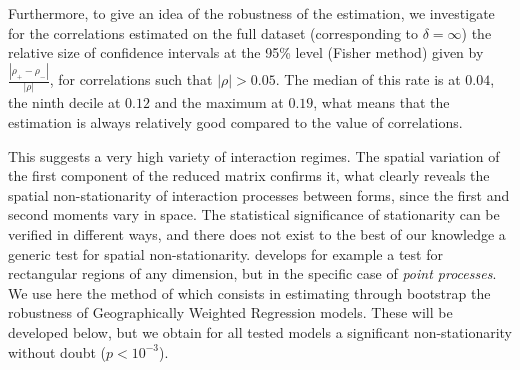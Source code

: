Furthermore, to give an idea of the robustness of the estimation, we investigate for the correlations estimated on the full dataset (corresponding to $\delta = \infty$) the relative size of confidence intervals at the 95\% level (Fisher method) given by $\frac{\left|\rho_+ - \rho_-\right|}{\left|\rho\right|}$, for correlations such that $\left|\rho\right|>0.05$. The median of this rate is at $0.04$, the ninth decile at $0.12$ and the maximum at $0.19$, what means that the estimation is always relatively good compared to the value of correlations.



This suggests a very high variety of interaction regimes. The spatial variation of the first component of the reduced matrix confirms it, what clearly reveals the spatial non-stationarity of interaction processes between forms, since the first and second moments vary in space. The statistical significance of stationarity can be verified in different ways, and there does not exist to the best of our knowledge a generic test for spatial non-stationarity. \cite{zhang2014test} develops for example a test for rectangular regions of any dimension, but in the specific case of \emph{point processes}. We use here the method of \cite{leung2000statistical} which consists in estimating through bootstrap the robustness of Geographically Weighted Regression models. These will be developed below, but we obtain for all tested models a significant non-stationarity without doubt ($p<10^{-3}$).







